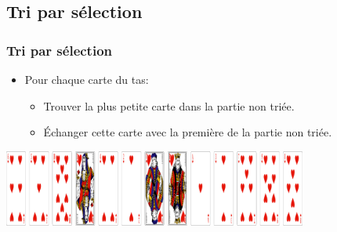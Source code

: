 \documentclass[svgnames,11pt]{beamer}
\begin{document}
\subsection{Tri par sélection}
\begin{frame}
    \frametitle{Tri par sélection}

    \begin{itemize}
        \item Pour chaque carte du tas:
              \begin{itemize}
                  \item Trouver la plus petite carte dans la partie non triée.
                  \item Échanger cette carte avec la première de la partie non triée.
              \end{itemize}

    \end{itemize}

\end{frame}
\begin{frame}

    \begin{center}
        \centering
        \includegraphics[width=10cm]{ressources/jeu-coeur-melange.png}
    \end{center}
    \begin{center}
    \end{center}

\end{frame}
\end{document}
